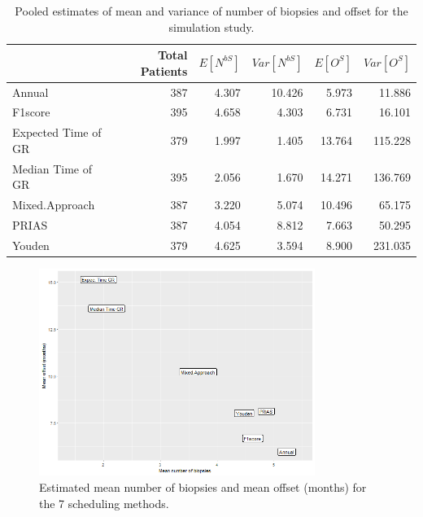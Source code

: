 \begin{table}[!htb]
\centering
\captionsetup{justification=centering}
\caption{Pooled estimates of mean and variance of number of biopsies and offset for the simulation study.}
\label{table : sim_study_pooled_estimates}
\begin{tabular}{@{}lrrrrr@{}}
\toprule
               & Total Patients & $E[N^{bS}]$ & $Var[N^{bS}]$ & $E[O^S]$ & $Var[O^S]$ \\ \midrule
Annual         & 387            & 4.307                           & 10.426                            & 5.973                      & 11.886                       \\
F1score        & 395            & 4.658                           & 4.303                             & 6.731                      & 16.101                       \\
Expected Time of GR           & 379            & 1.997                           & 1.405                             & 13.764                     & 115.228                      \\
Median Time of GR         & 395            & 2.056                           & 1.670                             & 14.271                     & 136.769                      \\
Mixed.Approach & 387            & 3.220                           & 5.074                             & 10.496                     & 65.175                       \\
PRIAS          & 387            & 4.054                           & 8.812                             & 7.663                      & 50.295                       \\
Youden         & 379            & 4.625                           & 3.594                             & 8.900                      & 231.035                      \\ \bottomrule
\end{tabular}
\end{table}

\begin{figure}[!htb]
	\centering
    \captionsetup{justification=centering}
	\includegraphics[width=0.8\textwidth]{images/sim_study/meanNbVsOffset.png}
	\caption{Estimated mean number of biopsies and mean offset (months) for the 7 scheduling methods.}
	\label{fig : meanNbVsOffset}
\end{figure}

